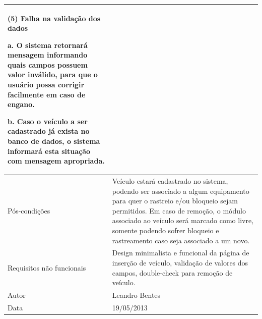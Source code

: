 \begin{flushleft}
\begin{supertabular}{|m{5.5680003cm}|m{9.325cm}|}
(5) Falha na validação dos dados

a. O sistema retornará mensagem informando quais campos possuem valor inválido, para que o usuário possa corrigir facilmente em caso de engano.

b. Caso o veículo a ser cadastrado já exista no banco de dados, o sistema informará esta situação com mensagem apropriada. \\\hline
Pós-condições &
Veículo estará cadastrado no sistema, podendo ser associado a algum equipamento para quer o rastreio e/ou bloqueio sejam permitidos. Em caso de remoção, o módulo associado ao veículo será marcado como livre, somente podendo sofrer bloqueio e rastreamento caso seja associado a um novo.\\\hline
Requisitos não funcionais &
Design minimalista e funcional da página de inserção de veículo, validação de valores dos campos, double-check para remoção de veículo.\\\hline
Autor &
Leandro Bentes\\\hline
Data &
19/05/2013\\\hline
\end{supertabular}
\end{flushleft}

